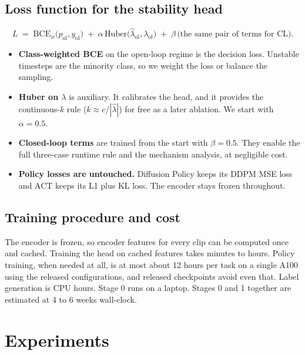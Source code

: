 \documentclass[11pt]{article}
\begin{document}
\subsection{Loss function for the stability head}

\begin{equation}
L \;=\; \mathrm{BCE}_w\bigl(p_{\mathrm{ol}}, y_{\mathrm{ol}}\bigr)
\;+\; \alpha\,\mathrm{Huber}\bigl(\hat\lambda_{\mathrm{ol}}, \lambda_{\mathrm{ol}}\bigr)
\;+\; \beta\,\bigl(\text{the same pair of terms for CL}\bigr).
\end{equation}

\begin{itemize}[leftmargin=2em]
  \item \textbf{Class-weighted BCE} on the open-loop regime is the decision loss.
        Unstable timesteps are the minority class, so we weight the loss or balance the
        sampling.
  \item \textbf{Huber on $\lambda$} is auxiliary. It calibrates the head, and it
        provides the continuous-$k$ rule ($k \approx c/|\hat\lambda|$) for free as a
        later ablation. We start with $\alpha = 0.5$.
  \item \textbf{Closed-loop terms} are trained from the start with $\beta = 0.5$. They
        enable the full three-case runtime rule and the mechanism analysis, at
        negligible cost.
  \item \textbf{Policy losses are untouched.} Diffusion Policy keeps its DDPM MSE loss
        and ACT keeps its L1 plus KL loss. The encoder stays frozen throughout.
\end{itemize}

\subsection{Training procedure and cost}

The encoder is frozen, so encoder features for every clip can be computed once and
cached. Training the head on cached features takes minutes to hours. Policy training,
when needed at all, is at most about 12 hours per task on a single A100 using the
released configurations, and released checkpoints avoid even that. Label generation is
CPU hours. Stage 0 runs on a laptop. Stages 0 and 1 together are estimated at 4 to 6
weeks wall-clock.

\section{Experiments}
\label{sec:experiments}
\end{document}
